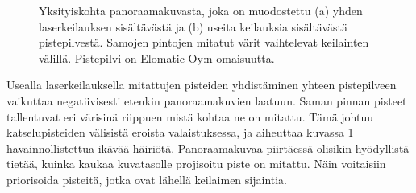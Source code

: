 \begin{figure}[t]
    \centering
    \caption{Yksityiskohta panoraamakuvasta, joka on muodostettu (a) yhden laserkeilauksen sisältävästä ja (b) useita keilauksia sisältävästä pistepilvestä. Samojen pintojen mitatut värit vaihtelevat keilainten välillä. Pistepilvi on Elomatic Oy:n omaisuutta.}
    \label{img:kaiuttimet}
\end{figure}

Usealla laserkeilauksella mitattujen pisteiden yhdistäminen yhteen pistepilveen vaikuttaa negatiivisesti etenkin panoraamakuvien laatuun. Saman pinnan pisteet tallentuvat eri värisinä riippuen mistä kohtaa ne on mitattu. Tämä johtuu katselupisteiden välisistä eroista valaistuksessa, ja aiheuttaa kuvassa \ref{img:kaiuttimet} havainnollistettua ikävää häiriötä. Panoraamakuvaa piirtäessä olisikin hyödyllistä tietää, kuinka kaukaa kuvatasolle projisoitu piste on mitattu. Näin voitaisiin priorisoida pisteitä, jotka ovat lähellä keilaimen sijaintia.

